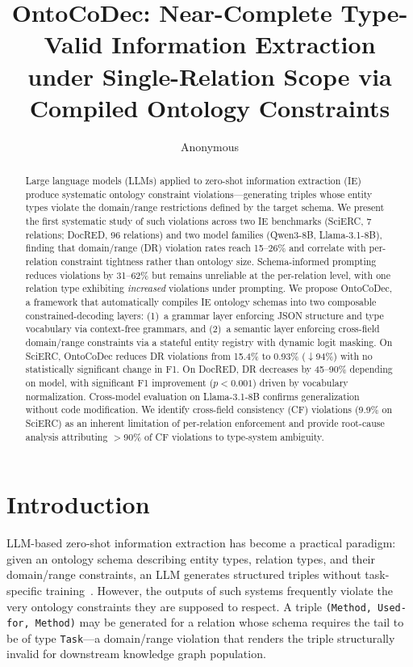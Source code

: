 \documentclass[11pt,a4paper]{article}
\title{OntoCoDec: Near-Complete Type-Valid Information Extraction\\under Single-Relation Scope via Compiled Ontology Constraints}
\author{Anonymous}
\date{}
\newcommand{\sys}{OntoCoDec\xspace}
\begin{document}
\maketitle

\begin{abstract}
Large language models (LLMs) applied to zero-shot information extraction (IE) produce systematic ontology constraint violations---generating triples whose entity types violate the domain/range restrictions defined by the target schema.
We present the first systematic study of such violations across two IE benchmarks (SciERC, 7 relations; DocRED, 96 relations) and two model families (Qwen3-8B, Llama-3.1-8B), finding that domain/range (DR) violation rates reach 15--26\% and correlate with per-relation constraint tightness rather than ontology size.
Schema-informed prompting reduces violations by 31--62\% but remains unreliable at the per-relation level, with one relation type exhibiting \emph{increased} violations under prompting.
We propose \sys, a framework that automatically compiles IE ontology schemas into two composable constrained-decoding layers: (1)~a grammar layer enforcing JSON structure and type vocabulary via context-free grammars, and (2)~a semantic layer enforcing cross-field domain/range constraints via a stateful entity registry with dynamic logit masking.
On SciERC, \sys reduces DR violations from 15.4\% to 0.93\% ($\downarrow$94\%) with no statistically significant change in F1. On DocRED, DR decreases by 45--90\% depending on model, with significant F1 improvement ($p<0.001$) driven by vocabulary normalization.
Cross-model evaluation on Llama-3.1-8B confirms generalization without code modification.
We identify cross-field consistency (CF) violations (9.9\% on SciERC) as an inherent limitation of per-relation enforcement and provide root-cause analysis attributing $>$90\% of CF violations to type-system ambiguity.
\end{abstract}

\section{Introduction}

LLM-based zero-shot information extraction has become a practical paradigm: given an ontology schema describing entity types, relation types, and their domain/range constraints, an LLM generates structured triples without task-specific training~\citep{wei2023zeroshot}.
However, the outputs of such systems frequently violate the very ontology constraints they are supposed to respect.
A triple \texttt{(Method, Used-for, Method)} may be generated for a relation whose schema requires the tail to be of type \texttt{Task}---a domain/range violation that renders the triple structurally invalid for downstream knowledge graph population.
\end{document}
